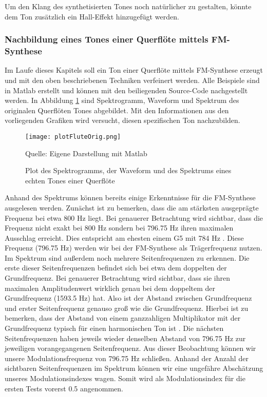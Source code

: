 Um den Klang des synthetisierten Tones noch natürlicher zu gestalten, könnte dem Ton zusätzlich ein Hall-Effekt hinzugefügt werden.


\FloatBarrier
\subsubsection{Nachbildung eines Tones einer Querflöte mittels FM-Synthese}

Im Laufe dieses Kapitels soll ein Ton einer Querflöte mittels FM-Synthese erzeugt und mit den oben beschriebenen Techniken verfeinert werden. Alle Beispiele sind in Matlab erstellt und können mit den beiliegenden Source-Code nachgestellt werden. In Abbildung \ref{fig:plotFluteOrig} sind Spektrogramm, Waveform und Spektrum des originalen Querflöten Tones abgebildet. Mit den Informationen aus den vorliegenden Grafiken wird versucht, diesen spezifischen Ton nachzubilden.

\begin{figure} [h!t!b!]
\centering
  \texttt{[image: plotFluteOrig.png]}
\caption{Plot des Spektrogramms, der Waveform und des Spektrums eines echten Tones einer Querflöte}
\label{fig:plotFluteOrig}
Quelle: Eigene Darstellung mit Matlab
\end{figure}

Anhand des Spektrums können bereits einige Erkenntnisse für die FM-Synthese ausgelesen werden. Zunächst ist zu bemerken, dass die am stärksten ausgeprägte Frequenz bei etwa 800 Hz liegt. Bei genauerer Betrachtung wird sichtbar, dass die Frequenz nicht exakt bei 800 Hz sondern bei 796.75 Hz ihren maximalen Ausschlag erreicht. Dies entspricht am ehesten einem G5 mit 784 Hz \cite[S. 181]{borucki}. Diese Frequenz (796.75 Hz) werden wir bei der FM-Synthese als Trägerfrequenz nutzen. Im Spektrum sind außerdem noch mehrere Seitenfrequenzen zu erkennen. Die erste dieser Seitenfrequenzen befindet sich bei etwa dem doppelten der Grundfrequenz. Bei genauerer Betrachtung wird sichtbar, dass sie ihren maximalen Amplitudenwert wirklich genau bei dem doppeltem der Grundfrequenz (1593.5 Hz) hat. Also ist der Abstand zwischen Grundfrequenz und erster Seitenfrequenz genauso groß wie die Grundfrequenz. Hierbei ist zu bemerken, dass der Abstand von einem ganzzahligen Multiplikator mit der Grundfrequenz typisch für einen harmonischen Ton ist \cite[S. 528]{chowningPaper}. Die nächsten Seitenfrequenzen haben jeweils wieder denselben Abstand von 796.75 Hz zur jeweiligen vorangegangenen Seitenfrequenz. Aus dieser Beobachtung können wir unsere Modulationsfrequenz von 796.75 Hz schließen. Anhand der Anzahl der sichtbaren Seitenfrequenzen im Spektrum können wir eine ungefähre Abschätzung unseres Modulationsindexes wagen. Somit wird als Modulationsindex für die ersten Tests vorerst 0.5 angenommen. 

